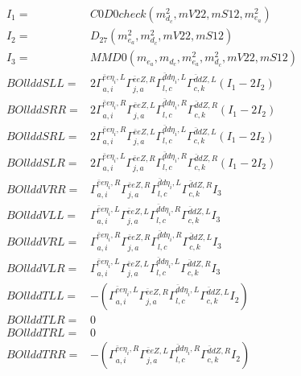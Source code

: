 \documentclass[A4,landscape]{article}
\begin{document}
\begin{align} 
I_1 = & C0D0check(m^2_{d_{{c}}}, mV22, mS12, m^2_{e_{{a}}}) \\ 
I_2 = & D_{27}(m^2_{e_{{a}}}, m^2_{d_{{c}}}, mV22, mS12) \\ 
I_3 = & MMD0(m_{e_{{a}}}, m_{d_{{c}}}, m^2_{e_{{a}}}, m^2_{d_{{c}}}, mV22, mS12) \\ 
  BOllddSLL= & 2  \Gamma^{\bar{e}e \eta_i ,L}_{a, i} \Gamma^{\bar{e}e Z ,R}_{j, a} \Gamma^{\bar{d}d \eta_i ,L}_{l, c} \Gamma^{\bar{d}d Z ,L}_{c, k} (I_1 - 2 I_2) \\ 
  BOllddSRR= & 2  \Gamma^{\bar{e}e \eta_i ,R}_{a, i} \Gamma^{\bar{e}e Z ,L}_{j, a} \Gamma^{\bar{d}d \eta_i ,R}_{l, c} \Gamma^{\bar{d}d Z ,R}_{c, k} (I_1 - 2 I_2) \\ 
  BOllddSRL= & 2  \Gamma^{\bar{e}e \eta_i ,R}_{a, i} \Gamma^{\bar{e}e Z ,L}_{j, a} \Gamma^{\bar{d}d \eta_i ,L}_{l, c} \Gamma^{\bar{d}d Z ,L}_{c, k} (I_1 - 2 I_2) \\ 
  BOllddSLR= & 2  \Gamma^{\bar{e}e \eta_i ,L}_{a, i} \Gamma^{\bar{e}e Z ,R}_{j, a} \Gamma^{\bar{d}d \eta_i ,R}_{l, c} \Gamma^{\bar{d}d Z ,R}_{c, k} (I_1 - 2 I_2) \\ 
  BOllddVRR= &  \Gamma^{\bar{e}e \eta_i ,R}_{a, i} \Gamma^{\bar{e}e Z ,R}_{j, a} \Gamma^{\bar{d}d \eta_i ,L}_{l, c} \Gamma^{\bar{d}d Z ,R}_{c, k} I_3 \\ 
  BOllddVLL= &  \Gamma^{\bar{e}e \eta_i ,L}_{a, i} \Gamma^{\bar{e}e Z ,L}_{j, a} \Gamma^{\bar{d}d \eta_i ,R}_{l, c} \Gamma^{\bar{d}d Z ,L}_{c, k} I_3 \\ 
  BOllddVRL= &  \Gamma^{\bar{e}e \eta_i ,R}_{a, i} \Gamma^{\bar{e}e Z ,R}_{j, a} \Gamma^{\bar{d}d \eta_i ,R}_{l, c} \Gamma^{\bar{d}d Z ,L}_{c, k} I_3 \\ 
  BOllddVLR= &  \Gamma^{\bar{e}e \eta_i ,L}_{a, i} \Gamma^{\bar{e}e Z ,L}_{j, a} \Gamma^{\bar{d}d \eta_i ,L}_{l, c} \Gamma^{\bar{d}d Z ,R}_{c, k} I_3 \\ 
  BOllddTLL= & -( \Gamma^{\bar{e}e \eta_i ,L}_{a, i} \Gamma^{\bar{e}e Z ,R}_{j, a} \Gamma^{\bar{d}d \eta_i ,L}_{l, c} \Gamma^{\bar{d}d Z ,L}_{c, k} I_2) \\ 
  BOllddTLR= & 0 \\ 
  BOllddTRL= & 0 \\ 
  BOllddTRR= & -( \Gamma^{\bar{e}e \eta_i ,R}_{a, i} \Gamma^{\bar{e}e Z ,L}_{j, a} \Gamma^{\bar{d}d \eta_i ,R}_{l, c} \Gamma^{\bar{d}d Z ,R}_{c, k} I_2) \\ 
\end{align} 
\end{document}
